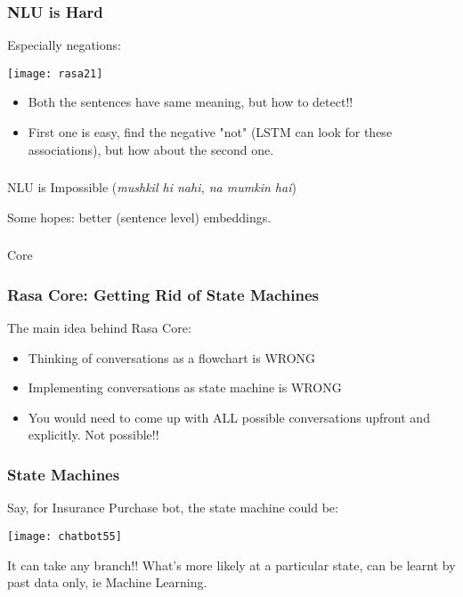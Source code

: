 \begin{frame}[fragile]\frametitle{NLU is Hard}

Especially negations:

\begin{center}
\texttt{[image: rasa21]}
\end{center}

\begin{itemize}
\item Both the sentences have same meaning, but how to detect!!
\item First one is easy, find the negative "not" (LSTM can look for these associations), but how about the second one.
\end{itemize}

\end{frame}

\begin{frame}[fragile]\frametitle{}

NLU is Impossible (\textit{mushkil hi nahi, na mumkin hai})

Some hopes: better (sentence level) embeddings.
\end{frame}

\begin{frame}[fragile]\frametitle{}
\begin{center}
{\Large Core}

\end{center}
\end{frame}

\begin{frame}[fragile]\frametitle{Rasa Core: Getting Rid of State Machines}
The main idea behind Rasa Core: 
\begin{itemize}
\item Thinking of conversations as a flowchart is WRONG
\item Implementing conversations as state machine is WRONG
\item You would need to come up with ALL possible conversations upfront and explicitly. Not possible!!
\end{itemize}

\end{frame}

 \begin{frame}[fragile]\frametitle{State Machines}
Say, for Insurance Purchase bot, the state machine could be:

\begin{center}
\texttt{[image: chatbot55]}

\end{center}

It can take any branch!! What's more likely at a particular state, can be learnt by past data only, ie Machine Learning.
\end{frame}


